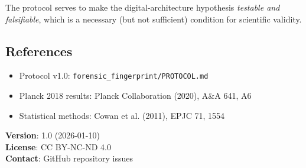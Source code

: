 The protocol serves to make the digital-architecture hypothesis \textit{testable and falsifiable}, which is a necessary (but not sufficient) condition for scientific validity.

\subsection{References}

\begin{itemize}
    \item Protocol v1.0: \texttt{forensic\_fingerprint/PROTOCOL.md}
    \item Planck 2018 results: Planck Collaboration (2020), A\&A 641, A6
    \item Statistical methods: Cowan et al. (2011), EPJC 71, 1554
\end{itemize}

\vspace{1em}
\noindent\textbf{Version}: 1.0 (2026-01-10)\\
\textbf{License}: CC BY-NC-ND 4.0\\
\textbf{Contact}: GitHub repository issues
